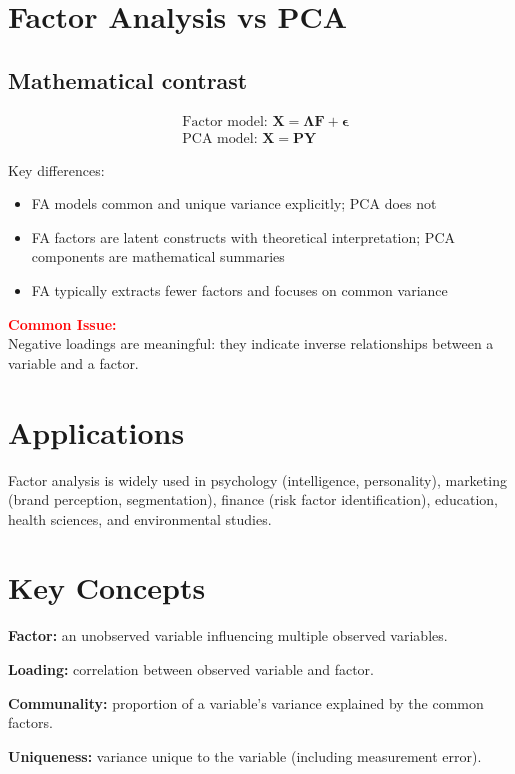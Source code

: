 \documentclass[a4paper,11pt]{tufte-book}
\newenvironment{commonissue}{%
  \begin{framed}
  \noindent\textcolor{red}{\textbf{Common Issue:}}\\
}{%
  \end{framed}
}
\begin{document}
\section{Factor Analysis vs PCA}

\subsection{Mathematical contrast}
\begin{align*}
  &\text{Factor model: } \mathbf{X} = \mathbf{\Lambda F} + \mathbf{\epsilon}\\
  &\text{PCA model: } \mathbf{X} = \mathbf{PY}
\end{align*}

Key differences:
\begin{itemize}
  \item FA models common and unique variance explicitly; PCA does not
  \item FA factors are latent constructs with theoretical interpretation; PCA components are mathematical summaries
  \item FA typically extracts fewer factors and focuses on common variance
\end{itemize}

\begin{commonissue}
Negative loadings are meaningful: they indicate inverse relationships between a variable and a factor.
\end{commonissue}

\section{Applications}
Factor analysis is widely used in psychology (intelligence, personality), marketing (brand perception, segmentation), finance (risk factor identification), education, health sciences, and environmental studies.

\section{Key Concepts}

\textbf{Factor:} an unobserved variable influencing multiple observed variables.

\textbf{Loading:} correlation between observed variable and factor.

\textbf{Communality:} proportion of a variable's variance explained by the common factors.

\textbf{Uniqueness:} variance unique to the variable (including measurement error).
\end{document}
